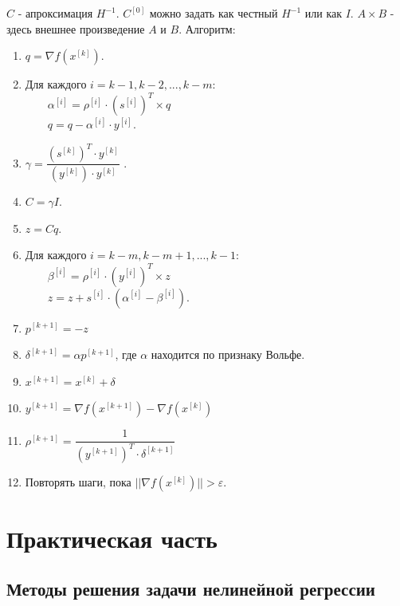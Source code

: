 \documentclass[a4paper,14pt,oneside,openany]{memoir}
\begin{document}
$C$ - апроксимация $H^{-1}$. $C^{[0]}$ можно задать как честный $H^{-1}$ или как $I$.
$A \times B$ - здесь внешнее произведение $A$ и $B$.
Алгоритм:
\begin{enumerate}
	\item $q = \nabla f(x^{[k]})$.
	\item Для каждого $i = k - 1, k - 2, ..., k - m$: \\
	$\quad\quad\alpha^{[i]} = \rho^{[i]} \cdot (s^{[i]})^T \times q$ \\
	$\quad\quad q = q - \alpha^{[i]} \cdot y^{[i]}$.
	\item $\gamma = \dfrac{(s^{[k]})^T\cdot y^{[k]}}{(y^{[k]}) \cdot y^{[k]}}$	.
	\item $C = \gamma I$.
	\item $z = Cq$.
	\item Для каждого $i = k - m, k - m + 1, ..., k - 1$: \\
		$\quad\quad\beta^{[i]} = \rho^{[i]} \cdot (y^{[i]})^T \times z$ \\
		$\quad\quad z = z + s^{[i]} \cdot (\alpha^{[i]} - \beta^{[i]})$. 
	\item $p^{[k + 1]} = -z$
	\item $\delta^{[k + 1]} = \alpha p^{[k + 1]}$, где $\alpha$ находится по признаку Вольфе.
	\item $x^{[k + 1]} = x^{[k]} + \delta$ 
	\item $y^{[k + 1]} =  \nabla f(x^{[k + 1]}) - \nabla f(x^{[k]})$
	\item $\rho^{[k + 1]} = \dfrac{1}{(y^{[k + 1]})^T \cdot\delta^{[k + 1]}}$
	\item Повторять шаги, пока  $||\nabla f(x^{[k]})|| > \varepsilon$.
\end{enumerate}


\chapter{Практическая часть}
 
\section{Методы решения задачи нелинейной регрессии}
\end{document}
